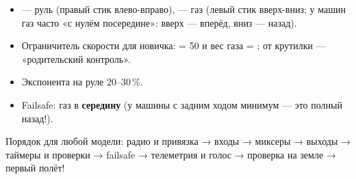 \begin{itemize}
  \item {} --- руль (правый стик влево-вправо),  --- газ (левый стик
        вверх-вниз; у машин газ часто «с нулём посередине»: вверх --- вперёд, вниз --- назад).
  \item Ограничитель скорости для новичка:  = 50 и вес газа = ;
         от крутилки  --- «родительский контроль».
  \item Экспонента на руле 20--30\,\%.
  \item Failsafe: газ в \textbf{середину} (у машины с задним ходом минимум --- это полный назад!).
\end{itemize}

\begin{summary}
Порядок для любой модели: радио и привязка → входы → миксеры → выходы → таймеры и
проверки → failsafe → телеметрия и голос → проверка на земле → первый полёт!
\end{summary}
